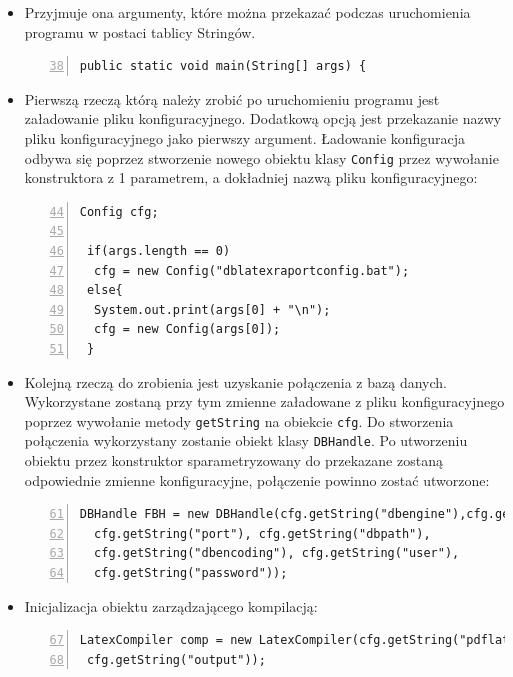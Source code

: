 \begin{itemize}

\item Przyjmuje ona argumenty, które można przekazać podczas uruchomienia programu w postaci tablicy Stringów.

 \begin{lstlisting}[numbers=left,firstnumber=38]
public static void main(String[] args) {
\end{lstlisting}
\vspace{5mm}

\item Pierwszą rzeczą którą należy zrobić po uruchomieniu programu jest załadowanie pliku konfiguracyjnego. Dodatkową opcją jest przekazanie nazwy pliku konfiguracyjnego jako pierwszy argument. Ładowanie konfiguracja odbywa się poprzez stworzenie nowego obiektu klasy \texttt{Config} przez wywołanie konstruktora z 1 parametrem, a dokładniej nazwą pliku konfiguracyjnego:

 \begin{lstlisting}[numbers=left,firstnumber=44]
 Config cfg;
        
 if(args.length == 0)
  cfg = new Config("dblatexraportconfig.bat");
 else{
  System.out.print(args[0] + "\n");
  cfg = new Config(args[0]);
 }
\end{lstlisting}
\vspace{5mm}

\item Kolejną rzeczą do zrobienia jest uzyskanie połączenia z bazą danych. Wykorzystane zostaną przy tym zmienne załadowane z pliku konfiguracyjnego poprzez wywołanie metody \texttt{getString} na obiekcie \texttt{cfg}. Do stworzenia połączenia wykorzystany zostanie obiekt klasy \texttt{DBHandle}. Po utworzeniu obiektu przez konstruktor sparametryzowany do przekazane zostaną odpowiednie zmienne konfiguracyjne, połączenie powinno zostać utworzone:


 \begin{lstlisting}[numbers=left,firstnumber=61]
 DBHandle FBH = new DBHandle(cfg.getString("dbengine"),cfg.getString("hostname"),
  cfg.getString("port"), cfg.getString("dbpath"),
  cfg.getString("dbencoding"), cfg.getString("user"),
  cfg.getString("password"));
\end{lstlisting}
\vspace{5mm}
\item Inicjalizacja obiektu zarządzającego kompilacją:

 \begin{lstlisting}[numbers=left,firstnumber=67]
 LatexCompiler comp = new LatexCompiler(cfg.getString("pdflatexpath"),
 cfg.getString("output"));
\end{lstlisting}


\end{itemize}
